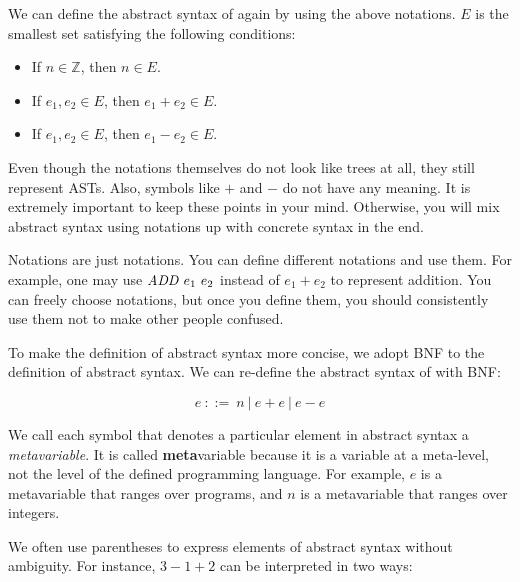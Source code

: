 We can define the abstract syntax of \Lang again by using the above notations.
$E$ is the smallest set satisfying the following conditions:

\begin{itemize}
  \item If $n\in\mathbb{Z}$, then $n\in E$.
  \item If $e_1,e_2\in E$, then $e_1+e_2\in E$.
  \item If $e_1,e_2\in E$, then $e_1-e_2\in E$.
\end{itemize}

Even though the notations themselves do not look like trees at all, they still
represent ASTs. Also, symbols like $+$ and $-$ do not have any meaning. It
is extremely important to keep these points in your mind. Otherwise, you will
mix abstract syntax using notations up with concrete syntax in the end.

Notations are just notations. You can define different notations and use them.
For example, one may use $\mbox{\emph{ADD}}\ e_1\ e_2$ instead of $e_1 + e_2$ to represent
addition. You can freely choose notations, but once you define them, you should
consistently use them not to make other people confused.

To make the definition of abstract syntax more concise, we adopt BNF to the
definition of abstract syntax. We can re-define the abstract syntax of \Lang with
BNF:

\[e\ ::=\ n\ |\ e+e\ |\ e-e\]

We call each symbol that denotes a particular element in abstract syntax a
\textit{metavariable}.
It is called \textbf{meta}variable because it is a variable at a
meta-level, not the level of the defined programming language. For example, $e$
is a metavariable that ranges over programs, and $n$ is a metavariable that
ranges over integers.

We often use parentheses to express elements of abstract syntax without
ambiguity. For instance, $3-1+2$ can be interpreted in two ways:

\begin{center}
\end{center}

